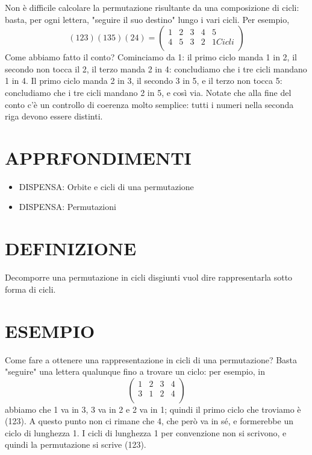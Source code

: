 Non è difficile calcolare la permutazione risultante da una composizione di cicli: basta, per ogni lettera, "seguire il suo destino" lungo
i vari cicli. Per esempio,
\[
 (123)(135)(24) = \left(\begin{array}{ccccc}
                         1 & 2 & 3 & 4 & 5 \\
                         4 & 5 & 3 & 2 & 1 Cicli\\
                        \end{array} \right)
\]
Come abbiamo fatto il conto? Cominciamo da 1: il primo ciclo manda 1 in 2, il secondo non tocca il 2, il terzo manda 2 in 4: concludiamo
che i tre cicli mandano 1 in 4. Il primo ciclo manda 2 in 3, il secondo 3 in 5, e il terzo non tocca 5: concludiamo che i tre cicli
mandano 2 in 5, e così via. Notate che alla fine del conto c'è un controllo di coerenza molto semplice:  tutti i numeri
nella seconda riga devono essere distinti.

\section{APPRFONDIMENTI}
\begin{itemize}
 \item DISPENSA: Orbite e cicli di una permutazione \cite{permutazione4}
 \item DISPENSA: Permutazioni \cite{permutazione2}
\end{itemize}



\section{DEFINIZIONE}
Decomporre una permutazione in cicli disgiunti vuol dire rappresentarla sotto forma di cicli.

\section{ESEMPIO}
Come fare a ottenere una rappresentazione in cicli di una permutazione? Basta "seguire" una lettera qualunque fino a trovare
un ciclo: per esempio, in 
\[
\left( \begin{array}{cccc} 1 & 2 & 3 & 4 \\ 3 & 1 & 2 & 4 \\ \end{array} \right) 
\]
abbiamo che 1 va in 3, 3 va in 2 e 2 va in 1; quindi il primo ciclo che troviamo è (123). A questo punto non ci rimane che 4,
che però va in sé, e formerebbe un ciclo di lunghezza 1. I cicli di lunghezza 1 per convenzione non si scrivono, e
quindi la permutazione si scrive (123).

